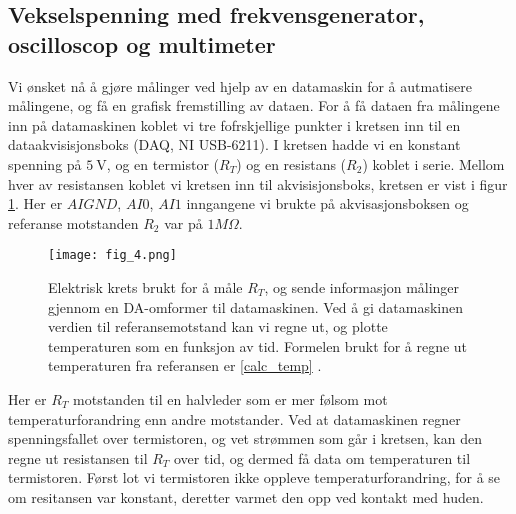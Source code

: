 \documentclass[%
 reprint,
nofootinbib,
aps,
]{revtex4-1}
\begin{document}
\subsection{Vekselspenning med frekvensgenerator, oscilloscop og multimeter}
Vi ønsket nå å gjøre målinger ved hjelp av en datamaskin for å autmatisere målingene, og få en grafisk fremstilling av dataen. For å få dataen fra målingene inn på datamaskinen koblet vi tre fofrskjellige punkter i kretsen inn til en dataakvisisjonsboks (DAQ, NI USB-6211). I kretsen hadde vi en konstant spenning på $\SI{5}{\volt}$, og en termistor ($R_T$) og en resistans ($R_2$) koblet i serie. Mellom hver av resistansen koblet vi kretsen inn til akvisisjonsboks, kretsen er vist i figur \ref{fig4}. Her er $AIGND$, $AI0$, $AI1$ inngangene vi brukte på akvisasjonsboksen og referanse motstanden $R_2$ var på $1M\Omega$.
\begin{figure}[h!]
    \centering
    \texttt{[image: fig\_4.png]}
    \caption{Elektrisk krets brukt for å måle $R_T$, og sende informasjon målinger gjennom en DA-omformer til datamaskinen. Ved å gi datamaskinen verdien til referansemotstand kan vi regne ut, og plotte temperaturen som en funksjon av tid. Formelen brukt for å regne ut temperaturen fra referansen er \eqref{calc_temp} \cite{oppgave}.}
    \label{fig4}
\end{figure}
Her er $R_T$ motstanden til en halvleder som er mer følsom mot temperaturforandring enn andre motstander. Ved at datamaskinen regner spenningsfallet over termistoren, og vet strømmen som går i kretsen, kan den regne ut resistansen til $R_T$ over tid, og dermed få data om temperaturen til termistoren. Først lot vi termistoren ikke oppleve temperaturforandring, for å se om resitansen var konstant, deretter varmet den opp ved kontakt med huden.
\end{document}
